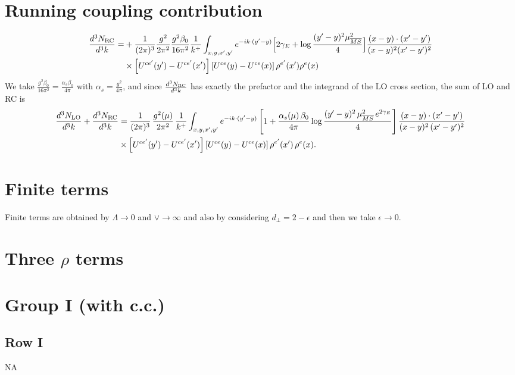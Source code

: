 \documentclass[9pt]{article}
\numberwithin{equation}{section}
\begin{document}
\section{Running coupling contribution}
\begin{align}
\frac{d^{3}N_{\rm RC}}{d^{3}k}= & +\frac{1}{(2\pi)^{3}}\frac{g^{2}}{2\pi^{2}}\frac{g^{2}\beta_{0}}{16\pi^{2}}\frac{1}{k^{+}}\int_{x,y,x',y'}e^{-ik\cdot(y'-y)}\Big[2\gamma_{E}+\log\frac{(y'-y)^{2}\mu^{2}_{\overline{MS}}}{4}\Big]\frac{(x-y)\cdot(x'-y')}{(x-y)^{2}(x'-y')^{2}}\notag\\
&\times\left[U^{ce'}(y') - U^{ce'}(x')\right]\left[U^{ce}(y) - U^{ce}(x)\right]\rho^{e'}(x')\rho^{e}(x)
\end{align}
We take $\frac{g^{2}\beta_{0}}{16\pi^{2}}=\frac{\alpha_{s}\beta_{0}}{4\pi}$ with $\alpha_{s}=\frac{g^{2}}{4\pi}$, and since $\frac{d^{3}N_{\rm RC}}{d^{3}k}$ has exactly the prefactor and the integrand of the LO cross section, the sum of LO and RC is
\begin{align}
\frac{d^{3}N_{\rm LO}}{d^{3}k}+\frac{d^{3}N_{\rm RC}}{d^{3}k}&=\frac{1}{(2\pi)^{3}}\,\frac{g^{2}(\mu)}{2\pi^{2}}\,\frac{1}{k^{+}}\int_{x,y,x',y'}e^{-ik\cdot(y'-y)}\left[1+\frac{\alpha_{s}(\mu)\,\beta_{0}}{4\pi}\log\frac{(y'-y)^{2}\,\mu^{2}_{\overline{MS}}\,e^{2\gamma_{E}}}{4}\right]\frac{(x-y)\cdot(x'-y')}{(x-y)^{2}\,(x'-y')^{2}}\notag\\
&\times\left[U^{ce'}(y')-U^{ce'}(x')\right]\left[U^{ce}(y)-U^{ce}(x)\right]\rho^{e'}(x')\,\rho^{e}(x).
\end{align}
\section{Finite terms}
Finite terms are obtained by $\Lambda \to 0$ and $\vee\to \infty $ and also by considering $d_{\perp} = 2-\epsilon$ and then we take $\epsilon \to 0$. 
\section*{Three $\rho$ terms}
\section{Group I (with c.c.)}
\subsection{Row I}
\textsc{NA}
\end{document}
